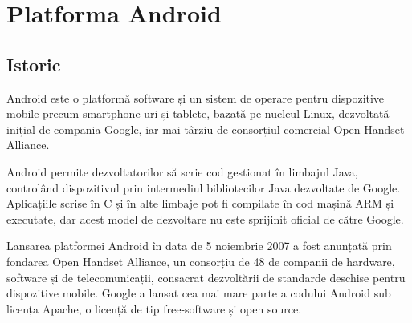 \chapter{Platforma Android}
\section{Istoric}
\vspace{1cm}
\begin{defn}Android este o platformă software și un sistem de operare pentru dispozitive mobile precum smartphone-uri și tablete, bazată pe nucleul Linux, dezvoltată inițial de compania Google, iar mai târziu de consorțiul comercial Open Handset Alliance\cite{5}. 
\end{defn}
Android permite dezvoltatorilor să scrie cod gestionat în limbajul Java, controlând dispozitivul prin intermediul bibliotecilor Java dezvoltate de Google\cite{6}. \newline
Aplicațiile scrise în C și în alte limbaje pot fi compilate în cod mașină ARM și executate, dar acest model de dezvoltare nu este sprijinit oficial de către Google\cite{7}\cite{8}. \newline
\bigskip

 Lansarea platformei Android în data de 5 noiembrie 2007 a fost anunțată prin fondarea Open Handset Alliance, un consorțiu de 48 de companii de hardware, software și de telecomunicații, consacrat dezvoltării de standarde deschise pentru dispozitive mobile. Google a lansat cea mai mare parte a codului Android sub licența Apache, o licență de tip free-software și open source.\cite{5}

